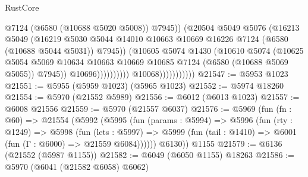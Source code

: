 \begin{lexlean}{RustCore}
\begin{coremodule}
                                              @7124
                                              (@6580 (@10688 @5020 @5008))
                                              @7945))
                                          (@20504
                                            @5049
                                            @5076
                                            (@16213
                                              @5049
                                              (@16219
                                                @5030
                                                @5044
                                                @14010
                                                @10663
                                                @10669
                                                @16226
                                                @7124
                                                (@6580 (@10688 @5044 @5031))
                                                @7945))
                                            (@10605
                                              @5074
                                              @1430
                                              (@10610
                                                @5074
                                                (@10625
                                                  @5054
                                                  @5069
                                                  @10634
                                                  @10663
                                                  @10669
                                                  @10685
                                                  @7124
                                                  (@6580 (@10688 @5069 @5055))
                                                  @7945))
                                              @10696))))))))))
                          @10068)))))))))))
@21547 := @5953 @1023
@21551 := @5955 (@5959 @1023) (@5965 @1023)
@21552 := @5974 @18260
@21554 := @5970 (@21552 @5989)
@21556 := @6012 (@6013 @1023)
@21557 := @6008 @21556
@21559 := @5970 (@21557 @6037)
@21576 := @5969
    (fun (fn : @60) =>
    @21554
      (@5992
        (@5995
          (fun (params : @5994) =>
          @5996
            (fun (rty : @1249) =>
            @5998
              (fun (lets : @5997) =>
              @5999 (fun (tail : @1410) => @6001 (fun (Γ : @6000) => @21559 @6084))))))
        @6130))
    @1155
@21579 := @6136 (@21552 (@5987 @1155))
@21582 := @6049 (@6050 @1155) @18263
@21586 := @5970 (@6041 (@21582 @6058) @6062)

\end{coremodule}
\end{lexlean}
